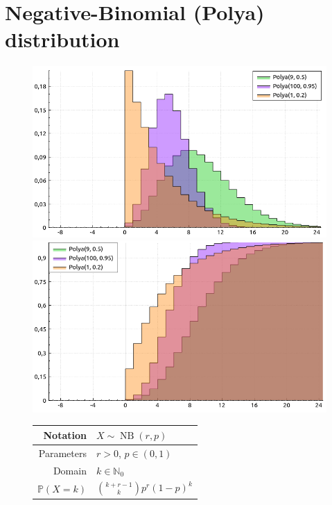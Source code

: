 \documentclass[a4paper,11pt]{article}
\theoremstyle{plain}
\theoremstyle{definition}
\newcommand{\MP}{\mathbb{P}}
\newcommand{\MN}{\mathbb{N}}
\begin{document}
	\section{Negative-Binomial (Polya) distribution}
	\begin{figure}[!htb]\centering
		\begin{minipage}{0.55\textwidth}
			\includegraphics[width=\linewidth, right]{negative-binomial_pmf}
			\captionsetup{labelformat=empty}
			\includegraphics[width=\linewidth, right]{negative-binomial_cdf}
			\captionsetup{labelformat=empty}
		\end{minipage}
		\begin{minipage}{0.4\textwidth}
			\begin{tabular}{| r | l |}
				\hline
				Notation & $ X \sim \operatorname{NB}(r, p) $\\
				\hline
				Parameters & $r > 0$, $p \in (0, 1)$ \\
				\hline
				Domain & $ k \in \MN_0 $  \\
				\hline
				$\MP(X = k)$ & $  \binom{k+r-1}{k} p^r (1-p)^k   $ \\

\end{tabular}
\end{minipage}
\end{figure}
\end{document}
